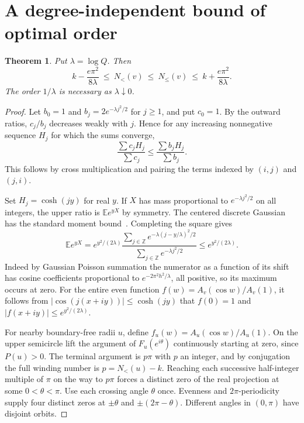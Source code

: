 \documentclass[11pt]{article}
\newtheorem{theorem}{Theorem}
\begin{document}
\section{A degree-independent bound of optimal order}
\begin{theorem}\label{jensen}
Put $\lambda=\log Q$. Then
\[
  k-\frac{e\pi^2}{8\lambda}\ \le\ N_{<}(v)\ \le\ N_{\le}(v)
     \ \le\ k+\frac{e\pi^2}{8\lambda}.
\]
The order $1/\lambda$ is necessary as $\lambda\downarrow0$.
\end{theorem}
\begin{proof}
Let $b_0=1$ and $b_j=2e^{-\lambda j^2/2}$ for $j\ge1$, and put $c_0=1$. By the outward ratios, $c_j/b_j$ decreases weakly with $j$. Hence for any increasing nonnegative sequence $H_j$ for which the sums converge,
\[
 \frac{\sum c_jH_j}{\sum c_j}\le\frac{\sum b_jH_j}{\sum b_j}.
\]
This follows by cross multiplication and pairing the terms indexed by $(i,j)$ and $(j,i)$.

Set $H_j=\cosh(jy)$ for real $y$. If $X$ has mass proportional to $e^{-\lambda j^2/2}$ on all integers, the upper ratio is $\mathbb E e^{yX}$ by symmetry. The centered discrete Gaussian has the standard moment bound~\cite{mp}. Completing the square gives
\[
 \mathbb E e^{yX}=e^{y^2/(2\lambda)}
  \frac{\sum_{j\in\mathbb Z}e^{-\lambda(j-y/\lambda)^2/2}}
       {\sum_{j\in\mathbb Z}e^{-\lambda j^2/2}}
 \le e^{y^2/(2\lambda)} .
\]
Indeed by Gaussian Poisson summation the numerator as a function of its shift has cosine coefficients proportional to $e^{-2\pi^2h^2/\lambda}$, all positive, so its maximum occurs at zero. For the entire even function $f(w)=A_v(\cos w)/A_v(1)$, it follows from $|\cos(j(x+iy))|\le\cosh(jy)$ that $f(0)=1$ and $|f(x+iy)|\le e^{y^2/(2\lambda)}$.

For nearby boundary-free radii $u$, define $f_u(w)=A_u(\cos w)/A_u(1)$. On the upper semicircle lift the argument of $F_u(e^{i\theta})$ continuously starting at zero, since $P(u)>0$. The terminal argument is $p\pi$ with $p$ an integer, and by conjugation the full winding number is $p=N_{<}(u)-k$. Reaching each successive half-integer multiple of $\pi$ on the way to $p\pi$ forces a distinct zero of the real projection at some $0<\theta<\pi$. Use each crossing angle $\theta$ once. Evenness and $2\pi$-periodicity supply four distinct zeros at $\pm\theta$ and $\pm(2\pi-\theta)$. Different angles in $(0,\pi)$ have disjoint orbits.


\end{proof}
\end{document}
